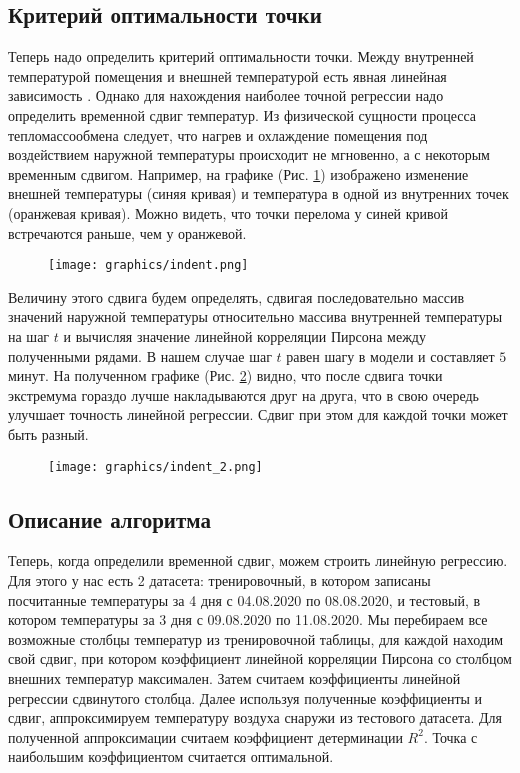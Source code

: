 \newpage


\subsection{Критерий оптимальности точки}

Теперь надо определить критерий оптимальности точки. Между внутренней температурой помещения и внешней температурой есть явная линейная зависимость \cite{indent}. Однако для нахождения наиболее точной регрессии надо определить временной сдвиг температур. Из физической сущности процесса тепломассообмена следует, что нагрев и охлаждение помещения под воздействием наружной температуры происходит не мгновенно, а с некоторым временным сдвигом. Например, на графике (Рис. \ref{indent1}) изображено изменение внешней температуры (синяя кривая) и температура в одной из внутренних точек (оранжевая кривая). Можно видеть, что точки перелома у синей кривой встречаются раньше, чем у оранжевой.

\begin{figure}[H]
\texttt{[image: graphics/indent.png]}
\caption{}
\label{indent1}
\end{figure}

\newpage

Величину этого сдвига будем определять, сдвигая последовательно массив значений наружной температуры относительно массива внутренней температуры на шаг $t$ и вычисляя значение линейной корреляции Пирсона между полученными рядами. В нашем случае шаг $t$ равен шагу в модели и составляет $5$ минут. На полученном графике (Рис. \ref{indent2}) видно, что после сдвига точки экстремума гораздо лучше накладываются друг на друга, что в свою очередь улучшает точность линейной регрессии. Сдвиг при этом для каждой точки может быть разный.

\begin{figure}[H]
\texttt{[image: graphics/indent\_2.png]}
\caption{}
\label{indent2}
\end{figure}

\newpage 


\subsection{Описание алгоритма}

Теперь, когда определили временной сдвиг, можем строить линейную регрессию. Для этого у нас есть 2 датасета: тренировочный, в котором записаны посчитанные температуры за 4 дня с 04.08.2020 по 08.08.2020, и тестовый, в котором температуры за 3 дня с 09.08.2020 по 11.08.2020. Мы перебираем все возможные столбцы температур из тренировочной таблицы, для каждой находим свой сдвиг, при котором коэффициент линейной корреляции Пирсона со столбцом внешних температур максимален. Затем считаем коэффициенты линейной регрессии сдвинутого столбца. Далее используя полученные коэффициенты и сдвиг, аппроксимируем температуру воздуха снаружи из тестового датасета. Для полученной аппроксимации считаем коэффициент детерминации $R^2$. Точка с наибольшим коэффициентом считается оптимальной.

